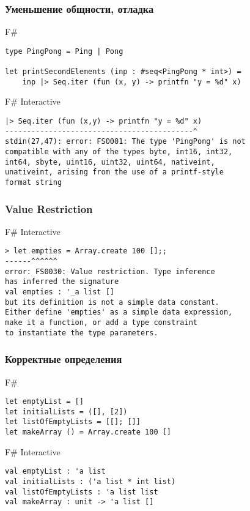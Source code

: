 \documentclass[xetex,mathserif,serif]{beamer}
\begin{document}
	\begin{frame}[fragile]
		\frametitle{Уменьшение общности, отладка}
		\begin{exampleblock}{F\#}
			\begin{lstlisting}
type PingPong = Ping | Pong

let printSecondElements (inp : #seq<PingPong * int>) =
    inp |> Seq.iter (fun (x, y) -> printfn "y = %d" x)
\end{lstlisting}
\end{exampleblock}

\begin{alertblock}{F\# Interactive}
\begin{lstlisting}[keywordstyle=\color{black}]
|> Seq.iter (fun (x,y) -> printfn "y = %d" x)
-------------------------------------------^
stdin(27,47): error: FS0001: The type 'PingPong' is not 
compatible with any of the types byte, int16, int32, 
int64, sbyte, uint16, uint32, uint64, nativeint, 
unativeint, arising from the use of a printf-style 
format string
\end{lstlisting}
\end{alertblock}
\end{frame}

	\begin{frame}[fragile]
		\frametitle{Value Restriction}
\begin{alertblock}{F\# Interactive}
\begin{lstlisting}[keywordstyle=\color{black}]
> let empties = Array.create 100 [];;
------^^^^^^
error: FS0030: Value restriction. Type inference 
has inferred the signature 
val empties : '_a list []
but its definition is not a simple data constant. 
Either define 'empties' as a simple data expression, 
make it a function, or add a type constraint 
to instantiate the type parameters.
\end{lstlisting}
\end{alertblock}
\end{frame}

	\begin{frame}[fragile]
		\frametitle{Корректные определения}
		\begin{exampleblock}{F\#}
			\begin{lstlisting}
let emptyList = []
let initialLists = ([], [2])
let listOfEmptyLists = [[]; []]
let makeArray () = Array.create 100 []
\end{lstlisting}
\end{exampleblock}
		
\begin{alertblock}{F\# Interactive}
\begin{lstlisting}[keywordstyle=\color{black}]
val emptyList : 'a list
val initialLists : ('a list * int list)
val listOfEmptyLists : 'a list list
val makeArray : unit -> 'a list []
\end{lstlisting}
\end{alertblock}
\end{frame}
\end{document}
